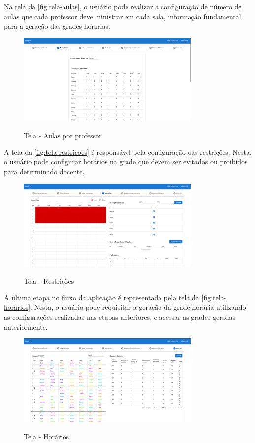 Na tela da \autoref{fig:tela-aulas}, o usuário pode realizar a configuração de número de aulas que cada professor deve ministrar em cada sala, informação fundamental para a geração das grades horárias.

\begin{figure}[!htb]
	\centering
	\caption{Tela - Aulas por professor}
	\includegraphics[width=0.8\textwidth]{./dados/figuras/tela_aulas}
	\label{fig:tela-aulas}
\end{figure}
\newpage

A tela da \autoref{fig:tela-restricoes} é responsável pela configuração das restrições. Nesta, o usuário pode configurar horários na grade que devem ser evitados ou proibidos para determinado docente.

\begin{figure}[!htb]
	\centering
	\caption{Tela - Restrições}
	\includegraphics[width=0.8\textwidth]{./dados/figuras/tela_restricoes}
	\label{fig:tela-restricoes}
\end{figure}

A última etapa no fluxo da aplicação é representada pela tela da \autoref{fig:tela-horarios}. Nesta, o usuário pode requisitar a geração da grade horária utilizando as configurações realizadas nas etapas anteriores, e acessar as grades geradas anteriormente.

\begin{figure}[!htb]
	\centering
	\caption{Tela - Horários}
	\includegraphics[width=0.8\textwidth]{./dados/figuras/tela_horarios}
	\label{fig:tela-horarios}
\end{figure}
\newpage